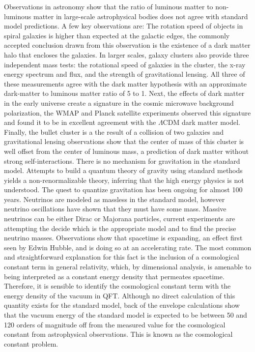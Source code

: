    \begin{enumerate}
       Observations in astronomy show that the ratio of luminous matter to non-luminous matter in large-scale astrophysical bodies does not agree with standard model predictions. A few key observations are: The rotation speed of objects in spiral galaxies is higher than expected at the galactic edges, the commonly accepted conclusion drawn from this observation is the existence of a dark matter halo that encloses the galaxies. In larger scales, galaxy clusters also provide three independent mass tests: the rotational speed of galaxies in the cluster, the x-ray energy spectrum and flux, and the strength of gravitational lensing. All three of these measurements agree with the dark matter hypothesis with an approximate dark-matter to luminous matter ratio of 5 to 1. \cite{rev_galaxy_clusters} Next, the effects of dark matter in the early universe create a signature in the cosmic microwave background polarization, the WMAP and Planck satellite experiments observed this signature and found it to be in excellent agreement with the $\Lambda$CDM dark matter model. \cite{WMAP} ~\cite{Planck} Finally, the bullet cluster is a the result of a collision of two galaxies and gravitational lensing observations show that the center of mass of this cluster is well offset from the center of luminous mass, a prediction of dark matter without strong self-interactions. \cite{particle_dm} \cite[ch. 26]{PDG}
       There is no mechanism for gravitation in the standard model. Attempts to build a quantum theory of gravity using standard methods yields a non-renormalizable theory, inferring that the high energy physics is not understood. The quest to quantize gravitation has been ongoing for almost 100 years.
       Neutrinos are modeled as massless in the standard model, however neutrino oscillations have shown that they must have some mass. Massive neutrinos can be either Dirac or Majorana particles, current experiments are attempting the decide which is the appropriate model and to find the precise neutrino masses.
       Observations show that spacetime is expanding, an effect first seen by Edwin Hubble, and is doing so at an accelerating rate. The most common and straightforward explanation for this fact is the inclusion of a cosmological constant term in general relativity, which, by dimensional analysis, is amenable to being interpreted as a constant energy density that permeates spacetime. Therefore, it is sensible to identify the cosmological constant term with the energy density of the vacuum in QFT. \cite{cc_problem} Although no direct calculation of this quantity exists for the standard model, back of the envelope calculations show that the vacuum energy of the standard model is expected to be between 50 and 120 orders of magnitude off from the measured value for the cosmological constant from astrophysical observations. This is known as the cosmological constant problem. \cite{cosmological_constant} \cite{weinberg_CC}

\end{enumerate}
